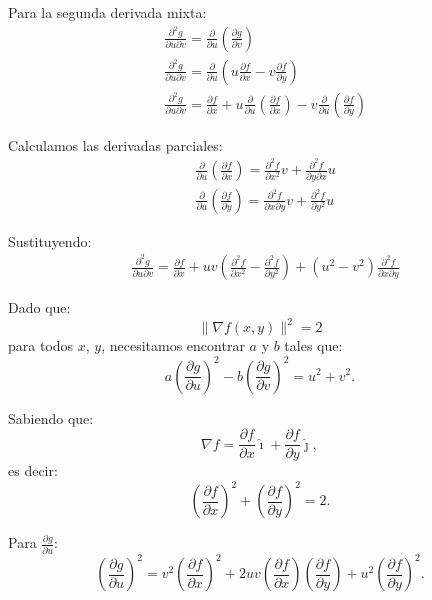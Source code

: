 \documentclass{report}
\begin{document}
    Para la segunda derivada mixta:
    $$
    \begin{aligned}
    & \frac{\partial^2 g}{\partial u \partial v} = \frac{\partial}{\partial u}\left(\frac{\partial g}{\partial v}\right) \\
    & \frac{\partial^2 g}{\partial u \partial v} = \frac{\partial}{\partial u}\left(u \frac{\partial f}{\partial x} - v \frac{\partial f}{\partial y}\right) \\
    & \frac{\partial^2 g}{\partial u \partial v} = \frac{\partial f}{\partial x} + u \frac{\partial}{\partial u} \left( \frac{\partial f}{\partial x} \right) - v \frac{\partial}{\partial u} \left( \frac{\partial f}{\partial y} \right) 
    \end{aligned}
    $$

    Calculamos las derivadas parciales:
    $$
    \begin{aligned}
    & \frac{\partial}{\partial u}\left(\frac{\partial f}{\partial x}\right) = \frac{\partial^2 f}{\partial x^2} v + \frac{\partial^2 f}{\partial y \partial x} u \\
    & \frac{\partial}{\partial u}\left(\frac{\partial f}{\partial y}\right) = \frac{\partial^2 f}{\partial x \partial y} v + \frac{\partial^2 f}{\partial y^2} u
    \end{aligned}
    $$

    Sustituyendo:
    $$
    \begin{aligned}
    & \frac{\partial^2 g}{\partial u \partial v} = \frac{\partial f}{\partial x} + uv \left( \frac{\partial^2 f}{\partial x^2} - \frac{\partial^2 f}{\partial y^2} \right) + (u^2 - v^2) \frac{\partial^2 f}{\partial x \partial y}
    \end{aligned}
    $$

    Dado que:
    $$
    \|\nabla f(x, y)\|^2 = 2
    $$
    para todos $x$, $y$, necesitamos encontrar $a$ y $b$ tales que:
    $$
    a \left(\frac{\partial g}{\partial u}\right)^2 - b \left(\frac{\partial g}{\partial v}\right)^2 = u^2 + v^2.
    $$

    Sabiendo que:
    $$
    \nabla f = \frac{\partial f}{\partial x} \hat{\imath} + \frac{\partial f}{\partial y} \hat{\jmath},
    $$
    es decir:
    $$
    \left(\frac{\partial f}{\partial x}\right)^2 + \left(\frac{\partial f}{\partial y}\right)^2 = 2.
    $$

    Para $\frac{\partial g}{\partial u}$:
    $$
    \left(\frac{\partial g}{\partial u}\right)^2 = v^2 \left(\frac{\partial f}{\partial x}\right)^2 + 2uv \left(\frac{\partial f}{\partial x}\right)\left(\frac{\partial f}{\partial y}\right) + u^2 \left(\frac{\partial f}{\partial y}\right)^2.
    $$
\end{document}
